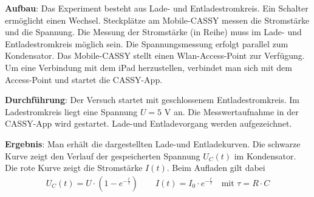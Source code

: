 \documentclass[../main.tex]{subfiles}
\begin{document}
\begin{tcolorbox}
\begin{minipage}[c]{0.5\textwidth}
        \end{minipage}
    
    \vspace{0.5cm}
    \textbf{Aufbau}: Das Experiment besteht aus Lade- und Entladestromkreis. Ein Schalter ermöglicht einen Wechsel. Steckplätze am Mobile-CASSY messen die Stromstärke und die Spannung. Die Messung der Stromstärke (in Reihe) muss im Lade- und Entladestromkreis möglich sein. Die Spannungsmessung erfolgt parallel zum Kondensator. Das Mobile-CASSY stellt einen Wlan-Access-Point zur Verfügung. Um eine Verbindung mit dem iPad herzustellen, verbindet man sich mit dem Access-Point und startet die CASSY-App. 
    
    \vspace{0.5cm} 
    \begin{minipage}[]{0.74\textwidth}
        \textbf{Durchführung}: Der Versuch startet mit geschlossenem Entladestromkreis. Im Ladestromkreis liegt eine Spannung $U=5$ V an. Die Messwertaufnahme in der CASSY-App wird gestartet. Lade-und Entladevorgang werden aufgezeichnet. 

        \vspace{0.5cm}
    \textbf{Ergebnis}: Man erhält die dargestellten Lade-und Entladekurven. Die schwarze Kurve zeigt den Verlauf der gespeicherten Spannung $U_C(t)$ im Kondensator. Die rote Kurve zeigt die Stromstärke $I(t)$. Beim Aufladen gilt dabei
\begin{align*}
    U_C(t) = U \cdot \left( 1-e^{-\frac{t}{\tau}}\right ) \qquad I(t)=I_0 \cdot e^{-\frac{t}{\tau}} \quad \text{mit} \,\, \tau = R \cdot C
\end{align*}
    

\end{minipage}
\end{tcolorbox}
\end{document}
